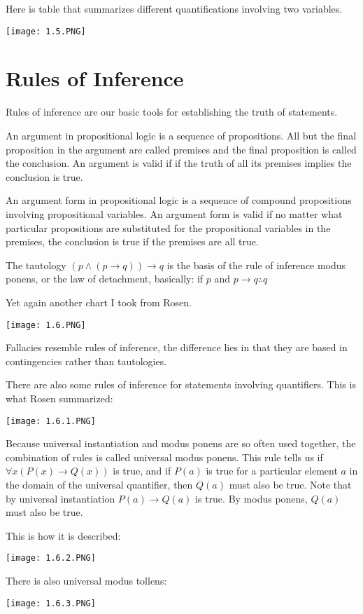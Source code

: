 \documentclass[../discrete.tex]{subfiles}
\begin{document}
Here is table that summarizes different quantifications involving two variables.
\begin{center}
    \texttt{[image: 1.5.PNG]}
\end{center}
\section{Rules of Inference}
Rules of inference are our basic tools for establishing the truth of statements.

An argument in propositional logic is a sequence of propositions. All but the final proposition in the argument are called premises and the final proposition is called the conclusion. An argument is valid if if the truth of all its premises implies the conclusion is true.

An argument form in propositional logic is a sequence of compound propositions involving propositional variables. An argument form is valid if no matter what particular propositions are substituted for the propositional variables in the premises, the conclusion is true if the premises are all true.

The tautology $(p\land(p\rightarrow q))\rightarrow q$ is the basis of the rule of inference modus ponens, or the law of detachment, basically: if $p$ and $p\rightarrow q \therefore q$

Yet again another chart I took from Rosen.
\begin{center}
    \texttt{[image: 1.6.PNG]}
\end{center}
Fallacies resemble rules of inference, the difference lies in that they are based in contingencies rather than tautologies.

There are also some rules of inference for statements involving quantifiers.
This is what Rosen summarized:
\begin{center}
    \texttt{[image: 1.6.1.PNG]}
\end{center}
Because universal instantiation and modus ponens are so often used together, the combination of rules is called universal modus ponens. This rule tells us if $\forall x (P(x)\rightarrow Q(x))$ is true, and if $P(a)$ is true for a particular element $a$ in the domain of the universal quantifier, then $Q(a)$ must also be true. Note that by universal instantiation $P(a)\rightarrow Q(a)$ is true. By modus ponens, $Q(a)$ must also be true. 

This is how it is described:
\begin{center}
    \texttt{[image: 1.6.2.PNG]}
\end{center}
There is also universal modus tollens:
\begin{center}
    \texttt{[image: 1.6.3.PNG]}
\end{center}
\end{document}
